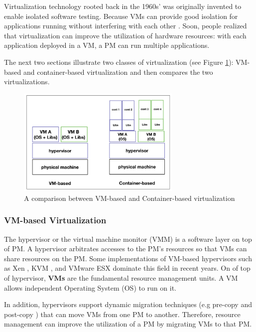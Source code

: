 Virtualization technology rooted back in the 1960s' was originally invented to enable isolated software testing. Because VMs can provide good isolation for applications running without interfering with each other \cite{Somani:2009ho}. Soon, people realized that virtualization can improve the utilization of hardware resources: with each application deployed in a VM, a PM can run multiple applications. 

The next two sections illustrate two classes of virtualization (see Figure \ref{fig:comparison}): VM-based and container-based virtualization and then compares the two virtualizations.

\begin{figure}
	\centering
	\includegraphics[width=0.7\textwidth]{pics/comparison.png}
	\caption{A comparison between VM-based and Container-based virtualization \cite{Piraghaj:2016bw}}
	\label{fig:comparison}
\end{figure}

\subsubsection{VM-based Virtualization} 

The hypervisor or the virtual machine monitor (VMM) is a software layer on top of PM. A hypervisor arbitrates accesses to the PM's resources so that VMs can share resources on the PM. Some implementations of VM-based hypervisors such as Xen \cite{Barham:2003cj}, KVM \cite{Kivity:2007wu}, and VMware ESX \cite{Waldspurger:2002db} dominate this field in recent years. On of top of hypervisor, \textbf{VMs} are the fundamental resource management units. A VM allows independent Operating System (OS) to run on it.  

In addition, hypervisors support dynamic migration techniques (e.g pre-copy \cite{Clark:2005ud} and post-copy \cite{Hines:2009fv}) that can move VMs from one PM to another. Therefore, resource management can improve the utilization of a PM by migrating VMs to that PM.

